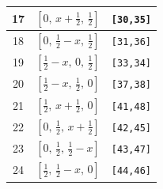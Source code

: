 \documentclass[fleqn,8pt]{jsarticle}
\begin{document}
\begin{longtable}{ccc}
17 & $\left[ 0,\, x + \frac{1}{2},\, \frac{1}{2} \right]$ & {\tt [30,35]} \\ \hline
18 & $\left[ 0,\, \frac{1}{2} - x,\, \frac{1}{2} \right]$ & {\tt [31,36]} \\ \hline
19 & $\left[ \frac{1}{2} - x,\, 0,\, \frac{1}{2} \right]$ & {\tt [33,34]} \\ \hline
20 & $\left[ \frac{1}{2} - x,\, \frac{1}{2},\, 0 \right]$ & {\tt [37,38]} \\ \hline
21 & $\left[ \frac{1}{2},\, x + \frac{1}{2},\, 0 \right]$ & {\tt [41,48]} \\ \hline
22 & $\left[ 0,\, \frac{1}{2},\, x + \frac{1}{2} \right]$ & {\tt [42,45]} \\ \hline
23 & $\left[ 0,\, \frac{1}{2},\, \frac{1}{2} - x \right]$ & {\tt [43,47]} \\ \hline
24 & $\left[ \frac{1}{2},\, \frac{1}{2} - x,\, 0 \right]$ & {\tt [44,46]} \\
\end{longtable}
\renewcommand{\arraystretch}{1.2}
\end{document}
